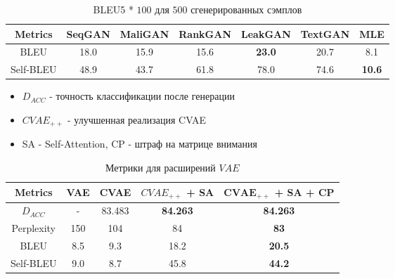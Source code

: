 \documentclass[10pt]{beamer}
\begin{document}
\begin{frame}

\begin{table}[H]
\begin{tabular}{c | c c c c c c}
\toprule
Metrics & SeqGAN & MaliGAN & RankGAN & LeakGAN & TextGAN & MLE \\
\midrule
BLEU & 18.0 & 15.9 & 15.6 & \textbf{23.0} & 20.7 & 8.1 \\
Self-BLEU & 48.9 & 43.7 & 61.8 & 78.0 & 74.6 & \textbf{10.6} \\
\bottomrule
\end{tabular}
\caption{BLEU5 * $100$ для $500$ сгенерированных сэмплов}
\end{table}

\begin{itemize}
    \item $D_{ACC}$ - точность классификации после генерации
    \item $CVAE_{++}$ - улучшенная реализация CVAE
    \item SA - Self-Attention, CP - штраф на матрице внимания
\end{itemize}

\begin{table}[H]
\begin{tabular}{c | c c c c}
\toprule
Metrics & VAE & CVAE & $CVAE_{++}$ + SA & \textbf{$\boldsymbol{CVAE_{++}}$ + SA + CP} \\
\midrule
$D_{ACC}$ & - & 83.483 & \textbf{84.263} & \textbf{84.263} \\
Perplexity & 150 & 104 & 84 & \textbf{83} \\
BLEU & 8.5 & 9.3 & 18.2 & \textbf{20.5} \\
Self-BLEU & 9.0 & 8.7 & 45.8 & \textbf{44.2} \\
\bottomrule
\end{tabular}
\caption{Метрики для расширений $VAE$}
\end{table}

\end{frame}
\end{document}
